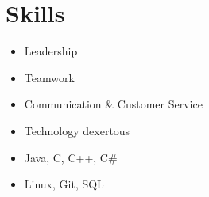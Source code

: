 \section{Skills}
\begin{itemize}
    \item Leadership
    \item Teamwork
    \item Communication \& Customer Service
    \item Technology dexertous
    \item Java, C, C++, C\#
    \item Linux, Git, SQL
\end{itemize}
